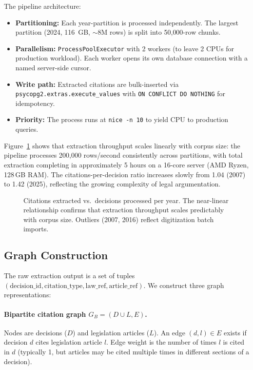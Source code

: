 \documentclass[11pt]{article}
\begin{document}
The pipeline architecture:

\begin{itemize}[leftmargin=*, nosep]
  \item \textbf{Partitioning:} Each year-partition is processed independently. The largest partition (2024, 116~GB, ${\sim}$8M rows) is split into 50{,}000-row chunks.
  \item \textbf{Parallelism:} \texttt{ProcessPoolExecutor} with 2 workers (to leave 2 CPUs for production workload). Each worker opens its own database connection with a named server-side cursor.
  \item \textbf{Write path:} Extracted citations are bulk-inserted via \texttt{psycopg2.extras.execute\_values} with \texttt{ON CONFLICT DO NOTHING} for idempotency.
  \item \textbf{Priority:} The process runs at \texttt{nice~-n~10} to yield CPU to production queries.
\end{itemize}

Figure~\ref{fig:scalability} shows that extraction throughput scales linearly with corpus size: the pipeline processes 200{,}000 rows/second consistently across partitions, with total extraction completing in approximately 5 hours on a 16-core server (AMD Ryzen, 128\,GB RAM). The citations-per-decision ratio increases slowly from 1.04 (2007) to 1.42 (2025), reflecting the growing complexity of legal argumentation.

\begin{figure}[t]
\centering

\caption{Citations extracted vs.\ decisions processed per year. The near-linear relationship confirms that extraction throughput scales predictably with corpus size. Outliers (2007, 2016) reflect digitization batch imports.}
\label{fig:scalability}
\end{figure}

\subsection{Graph Construction}
\label{sec:graph}

The raw extraction output is a set of tuples $(\text{decision\_id}, \text{citation\_type}, \text{law\_ref}, \text{article\_ref})$.
We construct three graph representations:

\paragraph{Bipartite citation graph $G_B = (D \cup L, E)$.}
Nodes are decisions ($D$) and legislation articles ($L$).
An edge $(d, l) \in E$ exists if decision $d$ cites legislation article $l$.
Edge weight is the number of times $l$ is cited in $d$ (typically 1, but articles may be cited multiple times in different sections of a decision).
\end{document}
